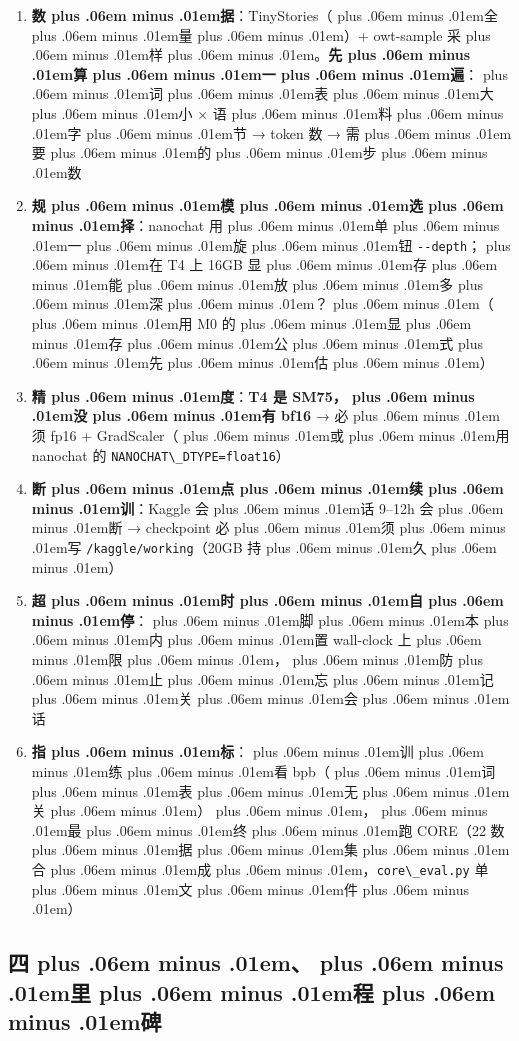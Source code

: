 \documentclass[
]{article}
\newcommand{\passthrough}[1]{#1}
\providecommand{\tightlist}{%
  \setlength{\itemsep}{0pt}\setlength{\parskip}{0pt}}
\def\zh#1{{\zhfont #1}}
\def\sym#1{{\symfont #1}}
\def\zhglue{\hskip0pt plus .06em minus .01em}
\begin{document}
\begin{enumerate}
\def\labelenumi{\arabic{enumi}.}
\tightlist
\item
  \textbf{\zh{数\zhglue 据}}\zh{：}TinyStories\zh{（\zhglue 全\zhglue 量\zhglue ）}+ owt-sample \zh{采\zhglue 样\zhglue 。}\textbf{\zh{先\zhglue 算\zhglue 一\zhglue 遍}}\zh{：\zhglue 词\zhglue 表\zhglue 大\zhglue 小} \sym{×} \zh{语\zhglue 料\zhglue 字\zhglue 节} \sym{→} token \zh{数} \sym{→} \zh{需\zhglue 要\zhglue 的\zhglue 步\zhglue 数}
\item
  \textbf{\zh{规\zhglue 模\zhglue 选\zhglue 择}}\zh{：}nanochat \zh{用\zhglue 单\zhglue 一\zhglue 旋\zhglue 钮} \passthrough{\lstinline!--depth!}\zh{；\zhglue 在} T4 \zh{上} 16GB \zh{显\zhglue 存\zhglue 能\zhglue 放\zhglue 多\zhglue 深\zhglue ？\zhglue （\zhglue 用} M0 \zh{的\zhglue 显\zhglue 存\zhglue 公\zhglue 式\zhglue 先\zhglue 估\zhglue ）}
\item
  \textbf{\zh{精\zhglue 度}}\zh{：}\textbf{T4 \zh{是} SM75\zh{，\zhglue 没\zhglue 有} bf16} \sym{→} \zh{必\zhglue 须} fp16 + GradScaler\zh{（\zhglue 或\zhglue 用} nanochat \zh{的} \passthrough{\lstinline!NANOCHAT\_DTYPE=float16!}\zh{）}
\item
  \textbf{\zh{断\zhglue 点\zhglue 续\zhglue 训}}\zh{：}Kaggle \zh{会\zhglue 话} 9--12h \zh{会\zhglue 断} \sym{→} checkpoint \zh{必\zhglue 须\zhglue 写} \passthrough{\lstinline!/kaggle/working!}\zh{（}20GB \zh{持\zhglue 久\zhglue ）}
\item
  \textbf{\zh{超\zhglue 时\zhglue 自\zhglue 停}}\zh{：\zhglue 脚\zhglue 本\zhglue 内\zhglue 置} wall-clock \zh{上\zhglue 限\zhglue ，\zhglue 防\zhglue 止\zhglue 忘\zhglue 记\zhglue 关\zhglue 会\zhglue 话}
\item
  \textbf{\zh{指\zhglue 标}}\zh{：\zhglue 训\zhglue 练\zhglue 看} bpb\zh{（\zhglue 词\zhglue 表\zhglue 无\zhglue 关\zhglue ）\zhglue ，\zhglue 最\zhglue 终\zhglue 跑} CORE\zh{（}22 \zh{数\zhglue 据\zhglue 集\zhglue 合\zhglue 成\zhglue ，}\passthrough{\lstinline!core\_eval.py!} \zh{单\zhglue 文\zhglue 件\zhglue ）}
\end{enumerate}

\subsection{\zh{四\zhglue 、\zhglue 里\zhglue 程\zhglue 碑}}\label{ux56dbux91ccux7a0bux7891}
\end{document}
